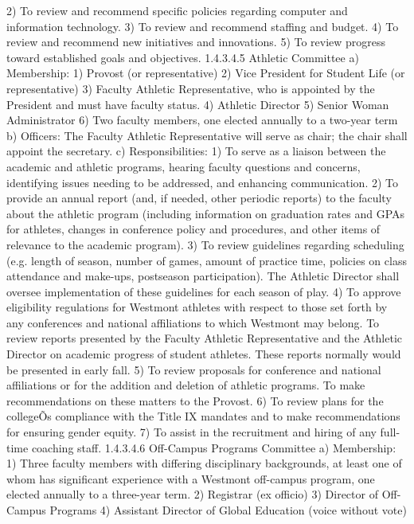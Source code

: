 \documentclass[letterpaper, 11pt]{article}
\begin{document}
2) To review and recommend specific policies regarding computer and information technology.
3) To review and recommend staffing and budget.
4) To review and recommend new initiatives and innovations.
5) To review progress toward established goals and objectives.
1.4.3.4.5 Athletic Committee
a) Membership:
1) Provost (or representative)
2) Vice President for Student Life (or representative)
3) Faculty Athletic Representative, who is appointed by the President and must have faculty status.
4) Athletic Director
5) Senior Woman Administrator
6) Two faculty members, one elected annually to a two-year term
b) Officers:
   The Faculty Athletic Representative will serve as chair; the chair shall appoint the secretary. 
c) Responsibilities:
1) To serve as a liaison between the academic and athletic programs, hearing faculty questions and concerns, identifying issues needing to be addressed, and enhancing communication.
2) To provide an annual report (and, if needed, other periodic reports) to the faculty about the athletic program (including information on graduation rates and GPAs for athletes, changes in conference policy and procedures, and other items of relevance to the academic program).
3) To review guidelines regarding scheduling (e.g. length of season, number of games, amount of practice time, policies on class attendance and make-ups, postseason participation).  The Athletic Director shall oversee implementation of these guidelines for each season of play.
4) To approve eligibility regulations for Westmont athletes with respect to those set forth by any conferences and national affiliations to which Westmont may belong.  To review reports presented by the Faculty Athletic Representative and the Athletic Director on academic progress of student athletes.  These reports normally would be presented in early fall.
5) To review proposals for conference and national affiliations or for the addition and deletion of athletic programs.  To make recommendations on these matters to the Provost.
6) To review plans for the collegeÕs compliance with the Title IX mandates and to make recommendations for ensuring gender equity.
7) To assist in the recruitment and hiring of any full-time coaching staff.
1.4.3.4.6 Off-Campus Programs Committee 
a) Membership:
1) Three faculty members with differing disciplinary backgrounds, at least one of whom has significant experience with a Westmont off-campus program, one elected annually to a three-year term.
2)  Registrar (ex officio)
3) Director of Off-Campus Programs
4) Assistant Director of Global Education (voice without vote)
\end{document}
